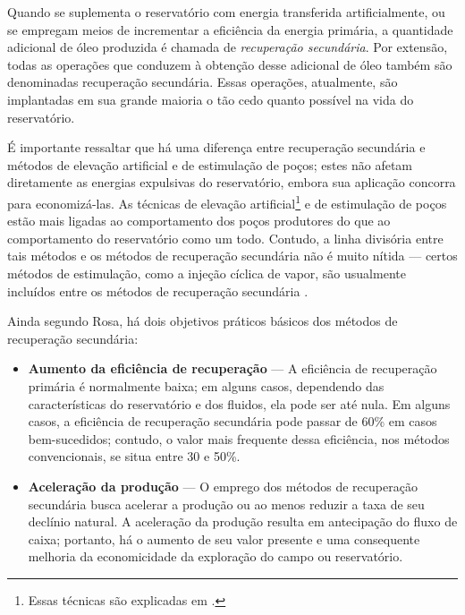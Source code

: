Quando se suplementa o reservat\'{o}rio com energia transferida artificialmente, ou se empregam meios de incrementar a efici\^{e}ncia da energia prim\'{a}ria, a quantidade adicional de \'{o}leo produzida \'{e} chamada de \textit{recupera\c{c}\~{a}o secund\'{a}ria}. Por extens\~{a}o, todas as opera\c{c}\~{o}es que conduzem \`{a} obten\c{c}\~{a}o desse adicional de \'{o}leo tamb\'{e}m s\~{a}o denominadas recupera\c{c}\~{a}o secund\'{a}ria. Essas opera\c{c}\~{o}es, atualmente, s\~{a}o implantadas em sua grande maioria o t\~{a}o cedo quanto poss\'{i}vel na vida do reservat\'{o}rio.

\'{E} importante ressaltar que h\'{a} uma diferen\c{c}a entre recupera\c{c}\~{a}o secund\'{a}ria e m\'{e}todos de eleva\c{c}\~{a}o artificial e de estimula\c{c}\~{a}o de po\c{c}os; estes n\~{a}o afetam diretamente as energias expulsivas do reservat\'{o}rio, embora sua aplica\c{c}\~{a}o concorra para economiz\'{a}-las. As t\'{e}cnicas de eleva\c{c}\~{a}o artificial\footnote{Essas t\'{e}cnicas s\~{a}o explicadas em \cite{engpetro}.} e de estimula\c{c}\~{a}o de po\c{c}os est\~{a}o mais ligadas ao comportamento dos po\c{c}os produtores do que ao comportamento do reservat\'{o}rio como um todo. Contudo, a linha divis\'{o}ria entre tais m\'{e}todos e os m\'{e}todos de recupera\c{c}\~{a}o secund\'{a}ria n\~{a}o \'{e} muito n\'{i}tida --- certos m\'{e}todos de estimula\c{c}\~{a}o, como a inje\c{c}\~{a}o c\'{i}clica de vapor, s\~{a}o usualmente inclu\'{i}dos entre os m\'{e}todos de recupera\c{c}\~{a}o secund\'{a}ria \cite{engres}.

Ainda segundo Rosa, h\'{a} dois objetivos pr\'{a}ticos b\'{a}sicos dos m\'{e}todos de recupera\c{c}\~{a}o secund\'{a}ria:

\begin{itemize}
\item \textbf{Aumento da efici\^{e}ncia de recupera\c{c}\~{a}o} --- A efici\^{e}ncia de recupera\c{c}\~{a}o prim\'{a}ria \'{e} normalmente baixa; em alguns casos, dependendo das caracter\'{i}sticas do reservat\'{o}rio e dos fluidos, ela pode ser at\'{e} nula. Em alguns casos, a efici\^{e}ncia de recupera\c{c}\~{a}o secund\'{a}ria pode passar de 60\% em casos bem-sucedidos; contudo, o valor mais frequente dessa efici\^{e}ncia, nos m\'{e}todos convencionais, se situa entre 30 e 50\%.
\item \textbf{Acelera\c{c}\~{a}o da produ\c{c}\~{a}o} --- O emprego dos m\'{e}todos de recupera\c{c}\~{a}o secund\'{a}ria busca acelerar a produ\c{c}\~{a}o ou ao menos reduzir a taxa de seu decl\'{i}nio natural. A acelera\c{c}\~{a}o da produ\c{c}\~{a}o resulta em antecipa\c{c}\~{a}o do fluxo de caixa; portanto, h\'{a} o aumento de seu valor presente e uma consequente melhoria da economicidade da explora\c{c}\~{a}o do campo ou reservat\'{o}rio.
\end{itemize}

